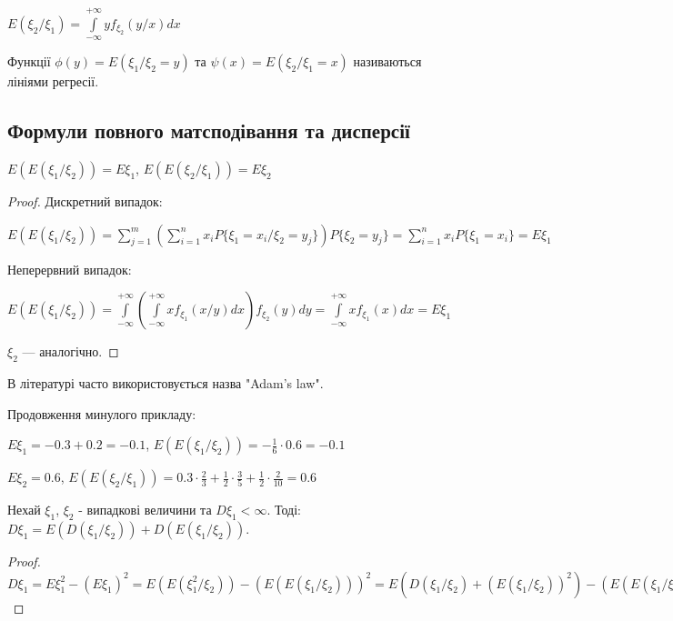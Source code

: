 $E(\xi_2 / \xi_1) = \int\limits_{-\infty}^{+\infty} yf_{\xi_2}(y/x)dx$

\begin{definition}
    Функції $\phi(y) = E(\xi_1 / \xi_2 = y)$ та 
    $\psi(x) = E(\xi_2 / \xi_1 = x)$ називаються лініями регресії.
\end{definition}
\subsection{Формули повного матсподівання та дисперсії}
\begin{proposition}
    $E(E(\xi_1 / \xi_2)) = E\xi_1$, $E(E(\xi_2 / \xi_1)) = E\xi_2$
\end{proposition}
\begin{proof}
    Дискретний випадок:

    $E(E(\xi_1 / \xi_2)) = \sum\limits_{j = 1}^m 
    \left(
        \sum\limits_{i=1}^n x_i P\{\xi_1 = x_i / \xi_2 = y_j\}
    \right) P\{\xi_2 = y_j\} = 
    \sum\limits_{i=1}^n x_i P\{\xi_1 = x_i\} = E\xi_1$

    Неперервний випадок:

    $E(E(\xi_1 / \xi_2)) = \int\limits_{-\infty}^{+\infty} 
    \left(
        \int\limits_{-\infty}^{+\infty} x f_{\xi_1}(x / y) dx
    \right) f_{\xi_2}(y) dy 
    = \int\limits_{-\infty}^{+\infty} x f_{\xi_1}(x) dx = E\xi_1$

    $\xi_2$ --- аналогічно.
\end{proof}

В літературі часто використовується назва "Adam's law".
\begin{example}
    Продовження минулого прикладу:

    $E\xi_1 = -0.3 + 0.2 = -0.1$, $E(E(\xi_1 / \xi_2)) = -\frac{1}{6}
    \cdot0.6 = -0.1$

    $E\xi_2 = 0.6$, $E(E(\xi_2 / \xi_1)) = 0.3\cdot\frac{2}{3} + 
    \frac{1}{2}\cdot\frac{3}{5} + \frac{1}{2} \cdot\frac{2}{10} = 
    0.6$
\end{example}

\begin{proposition}
    Нехай $\xi_1$, $\xi_2$ - випадкові величини та $D\xi_1 < \infty$. 
    Тоді:
    $D\xi_1 = E(D(\xi_1/\xi_2)) + D(E(\xi_1 / \xi_2))$.
\end{proposition}

\begin{proof}
    $D\xi_1 = E\xi_1^2 - (E \xi_1)^2 = 
    E(E(\xi_1^2 / \xi_2)) - (E(E(\xi_1/\xi_2)))^2 = 
    E(D(\xi_1/\xi_2) + (E(\xi_1/\xi_2))^2) - (E(E(\xi_1/\xi_2)))^2 = 
    E(D(\xi_1 / \xi_2)) + (E(E(\xi_1/\xi_2)^2) - 
    (E(E(\xi_1 / \xi_2)))^2) = E(D(\xi_1/\xi_2)) + D(E(\xi_1/\xi_2))$
\end{proof}


